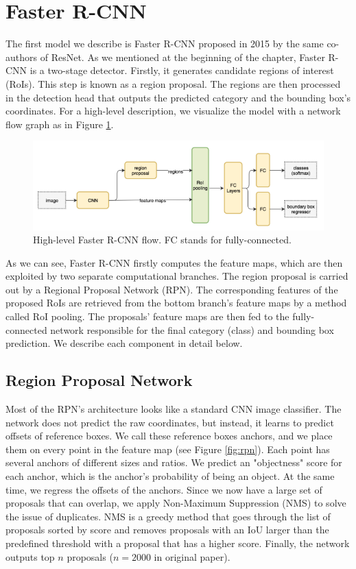 \section{Faster R-CNN}
The first model we describe is Faster R-CNN proposed in 2015 by the same co-authors of ResNet. As we mentioned at the beginning of the chapter, Faster R-CNN is a two-stage detector. Firstly, it generates candidate regions of interest (RoIs). This step is known as a region proposal. The regions are then processed in the detection head that outputs the predicted category and the bounding box's coordinates.  For a high-level description, we visualize the model with a network flow graph as in Figure \ref{fig:fasterrcnn}. 

\begin{figure}[h]
    \centering
    \includegraphics[width=\linewidth]{Sources/Figures/fasterrcnn.png}
    \caption{High-level Faster R-CNN flow. FC stands for fully-connected. }
    \label{fig:fasterrcnn}
\end{figure}

As we can see, Faster R-CNN firstly computes the feature maps, which are then exploited by two separate computational branches. The region proposal is carried out by a Regional Proposal Network (RPN). The corresponding features of the proposed RoIs are retrieved from the bottom branch's feature maps by a method called RoI pooling. The proposals' feature maps are then fed to the fully-connected network responsible for the final category (class) and bounding box prediction. We describe each component in detail below.

\subsection{Region Proposal Network}
Most of the RPN's architecture looks like a standard CNN image classifier. The network does not predict the raw coordinates, but instead, it learns to predict offsets of reference boxes. We call these reference boxes anchors, and we place them on every point in the feature map (see Figure \ref{fig:rpn}). Each point has several anchors of different sizes and ratios. We predict an "objectness" score for each anchor, which is the anchor's probability of being an object. At the same time, we regress the offsets of the anchors. Since we now have a large set of proposals that can overlap, we apply Non-Maximum Suppression (NMS) to solve the issue of duplicates. NMS is a greedy method that goes through the list of proposals sorted by score and removes proposals with an IoU larger than the predefined threshold with a proposal that has a higher score. Finally, the network outputs top $n$ proposals ($n = 2000$ in original paper).

